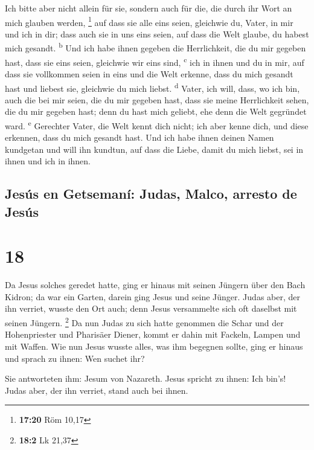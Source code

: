  Ich bitte aber nicht allein für sie, sondern auch für
die, die durch ihr Wort an mich glauben werden, \footnote{\textbf{17:20}
  Röm 10,17}  auf dass sie alle eins seien, gleichwie du,
Vater, in mir und ich in dir; dass auch sie in uns eins seien, auf dass
die Welt glaube, du habest mich gesandt. \textsuperscript{b}
 Und ich habe ihnen gegeben die Herrlichkeit, die du mir
gegeben hast, dass sie eins seien, gleichwie wir eins sind,
\textsuperscript{c}  ich in ihnen und du in mir, auf dass
sie vollkommen seien in eins und die Welt erkenne, dass du mich gesandt
hast und liebest sie, gleichwie du mich liebst. \textsuperscript{d}
 Vater, ich will, dass, wo ich bin, auch die bei mir
seien, die du mir gegeben hast, dass sie meine Herrlichkeit sehen, die
du mir gegeben hast; denn du hast mich geliebt, ehe denn die Welt
gegründet ward. \textsuperscript{e}  Gerechter Vater, die
Welt kennt dich nicht; ich aber kenne dich, und diese erkennen, dass du
mich gesandt hast.  Und ich habe ihnen deinen Namen
kundgetan und will ihn kundtun, auf dass die Liebe, damit du mich
liebst, sei in ihnen und ich in ihnen.

\hypertarget{jesuxfas-en-getsemanuxed-judas-malco-arresto-de-jesuxfas}{%
\subsection{Jesús en Getsemaní: Judas, Malco, arresto de
Jesús}\label{jesuxfas-en-getsemanuxed-judas-malco-arresto-de-jesuxfas}}

\hypertarget{section-17}{%
\section{18}\label{section-17}}

 Da Jesus solches geredet hatte, ging er hinaus mit seinen
Jüngern über den Bach Kidron; da war ein Garten, darein ging Jesus und
seine Jünger.  Judas aber, der ihn verriet, wusste den Ort
auch; denn Jesus versammelte sich oft daselbst mit seinen Jüngern.
\footnote{\textbf{18:2} Lk 21,37}  Da nun Judas zu sich
hatte genommen die Schar und der Hohenpriester und Pharisäer Diener,
kommt er dahin mit Fackeln, Lampen und mit Waffen.  Wie
nun Jesus wusste alles, was ihm begegnen sollte, ging er hinaus und
sprach zu ihnen: Wen suchet ihr?

 Sie antworteten ihm: Jesum von Nazareth. Jesus spricht zu
ihnen: Ich bin's! Judas aber, der ihn verriet, stand auch bei ihnen.

